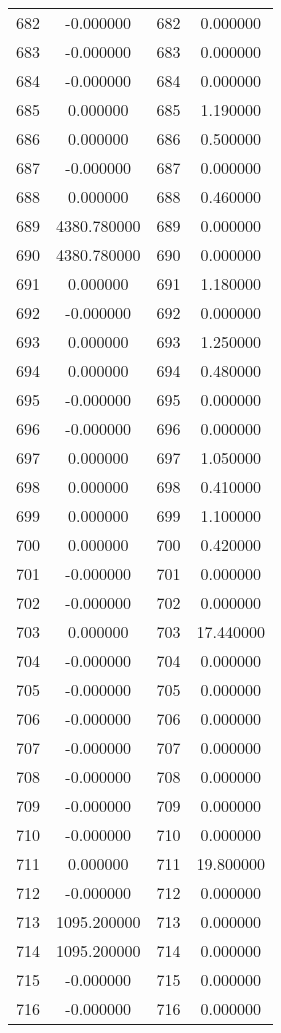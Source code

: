 \documentclass[12pt]{article}
\begin{document}
\begin{longtable}{@{}cccc@{}}
682 & -0.000000 & 682 & 0.000000 \\
683 & -0.000000 & 683 & 0.000000 \\
684 & -0.000000 & 684 & 0.000000 \\
685 & 0.000000 & 685 & 1.190000 \\
686 & 0.000000 & 686 & 0.500000 \\
687 & -0.000000 & 687 & 0.000000 \\
688 & 0.000000 & 688 & 0.460000 \\
689 & 4380.780000 & 689 & 0.000000 \\
690 & 4380.780000 & 690 & 0.000000 \\
691 & 0.000000 & 691 & 1.180000 \\
692 & -0.000000 & 692 & 0.000000 \\
693 & 0.000000 & 693 & 1.250000 \\
694 & 0.000000 & 694 & 0.480000 \\
695 & -0.000000 & 695 & 0.000000 \\
696 & -0.000000 & 696 & 0.000000 \\
697 & 0.000000 & 697 & 1.050000 \\
698 & 0.000000 & 698 & 0.410000 \\
699 & 0.000000 & 699 & 1.100000 \\
700 & 0.000000 & 700 & 0.420000 \\
701 & -0.000000 & 701 & 0.000000 \\
702 & -0.000000 & 702 & 0.000000 \\
703 & 0.000000 & 703 & 17.440000 \\
704 & -0.000000 & 704 & 0.000000 \\
705 & -0.000000 & 705 & 0.000000 \\
706 & -0.000000 & 706 & 0.000000 \\
707 & -0.000000 & 707 & 0.000000 \\
708 & -0.000000 & 708 & 0.000000 \\
709 & -0.000000 & 709 & 0.000000 \\
710 & -0.000000 & 710 & 0.000000 \\
711 & 0.000000 & 711 & 19.800000 \\
712 & -0.000000 & 712 & 0.000000 \\
713 & 1095.200000 & 713 & 0.000000 \\
714 & 1095.200000 & 714 & 0.000000 \\
715 & -0.000000 & 715 & 0.000000 \\
716 & -0.000000 & 716 & 0.000000 \\

\end{longtable}
\end{document}

